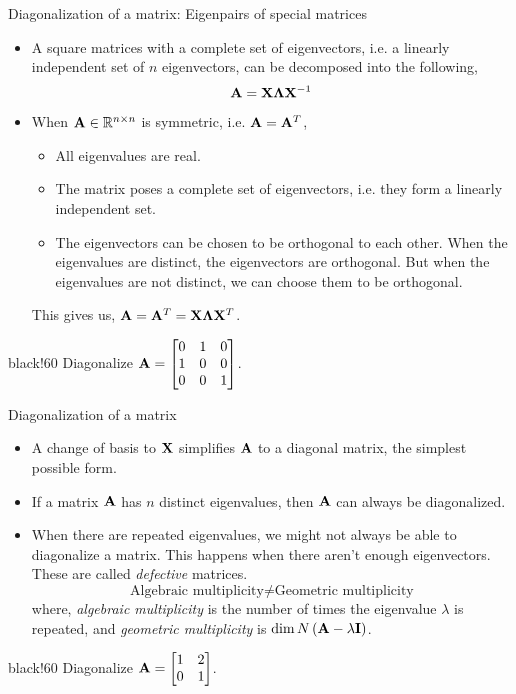\documentclass[aspectratio=169]{beamer}
\def\mf{\ensuremath\mathbf}
\def\mb{\ensuremath\mathbb}
\def\lp{\ensuremath\left(}
\def\rp{\ensuremath\right)}
\def\bmx{\ensuremath\begin{bmatrix*}[r]}
\def\emx{\ensuremath\end{bmatrix*}}
\newcommand{\demoex}[2]{\onslide<#1->\begin{color}{black!60} #2 \end{color}}
\begin{document}
\begin{frame}[t]{Diagonalization of a matrix: Eigenpairs of special matrices}
\begin{itemize}
    \item A square matrices with a complete set of eigenvectors, i.e. a linearly independent set of $n$ eigenvectors, can be decomposed into the following,
    \[ \mf{A} = \mf{X}\mf{\Lambda}\mf{X}^{-1} \]

    \item When $\mf{A} \in \mb{R}^{n \times n}$ is symmetric, i.e. $\mf{A} = \mf{A}^T$,
    \begin{itemize}
        \item All eigenvalues are real.
        \item The matrix poses a complete set of eigenvectors, i.e. they form a linearly independent set.
        \item The eigenvectors can be chosen to be orthogonal to each other. When the eigenvalues are distinct, the eigenvectors are orthogonal. But when the eigenvalues are not distinct, we can choose them to be orthogonal.
    \end{itemize}
    This gives us, $\mf{A} = \mf{A}^T = \mf{X}\mf{\Lambda}\mf{X}^T$.
\end{itemize}

\demoex{2}{
    Diagonalize $\mf{A} = \bmx 0 & 1 & 0\\1 & 0 & 0\\0 & 0 & 1\emx$.
}\vspace{0.2cm}
\end{frame}


\begin{frame}[t]{Diagonalization of a matrix}
\begin{itemize}
    \item A change of basis to $\mf{X}$ simplifies $\mf{A}$ to a diagonal matrix, the simplest possible form.

    \item If a matrix $\mf{A}$ has $n$ distinct eigenvalues, then $\mf{A}$ can always be diagonalized.

    \item When there are repeated eigenvalues, we might not always be able to diagonalize a matrix. This happens when there aren't enough eigenvectors. These are called \textit{defective} matrices.
    \[ \text{Algebraic multiplicity} \neq \text{Geometric multiplicity} \]
    where, \textit{algebraic multiplicity} is the number of times the eigenvalue $\lambda$ is repeated, and \textit{geometric multiplicity} is $\dim N\lp \mf{A} - \lambda\mf{I}\rp$.
\end{itemize}

\demoex{2}{
    Diagonalize $\mf{A} = \bmx 1 & 2\\0 & 1\emx$.
}\vspace{0.2cm}

\end{frame}
\end{document}
